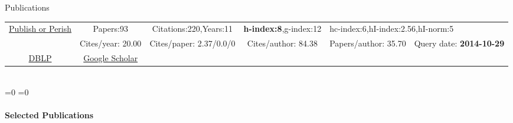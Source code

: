 \begin{rubrique}{Publications}

    {\footnotesize

      \begin{tabular}{|c||ccccc|}
        \hline
        \multirow{2}{4em}{\href{http://www.harzing.com/pop.htm}{Publish or Perish}} &
        Papers:93    & Citations:220,Years:11     & \textbf{h-index:8},g-index:12 &
        \multicolumn{2}{l|}{hc-index:6,hI-index:2.56,hI-norm:5}
        \\
        &Cites/year: 20.00 & Cites/paper: 2.37/0.0/0  & Cites/author: 84.38 &
        Papers/author: 35.70 & Query date: \textbf{2014-10-29}
        \\
        \hline
        \href{http://www.informatik.uni-trier.de/~ley/pers/hd/v/Varrette:S=eacute=bastien.html}{DBLP} & 
        \multicolumn{1}{c|}{\href{https://scholar.google.fr/citations?hl=fr\&user=6PTStIcAAAAJ\&view_op=list_works\&sortby=pubdate}{Google Scholar}}\\
        \cline{1-2} 
      \end{tabular}
    }
    ~\\[2em]

    \ifnum\pdfstrcmp{\cvtype}{\cvtiny}=0%
    \else
    \ifnum\pdfstrcmp{\cvtype}{\cvfull}=0%



    \else
    \vspace{-1em}
    \paragraph{Selected Publications}~\\

    \fi
    \fi
    
\end{rubrique}





% 

